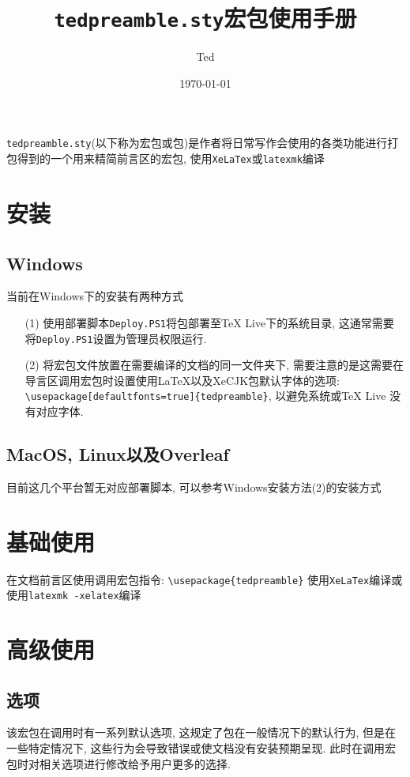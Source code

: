 \documentclass[12pt]{article}
\title{\texttt{tedpreamble.sty}宏包使用手册}
\author{Ted}
\date{\today}
\begin{document}
	\pagestyle{empty}
	\makeopening[email=true, ver=zh, time=zh]
	\begin{center}
		\parbox{0.6\textwidth}{\texttt{tedpreamble.sty}(以下称为宏包或包)是作者将日常写作会使用的各类功能进行打包得到的一个用来精简前言区的宏包, 使用\texttt{XeLaTex}或\texttt{latexmk}编译}
	\end{center}
	\newpage
	\tcbnonumber
	\newpage
	\pagestyle{fancy}
	\setcounter{page}{1}
	\section{安装}
	\subsection{Windows}
	当前在Windows下的安装有两种方式
	\begin{enumerate}
		\item[(1)] 使用部署脚本\texttt{Deploy.PS1}将包部署至TeX Live下的系统目录, 这通常需要将\texttt{Deploy.PS1}设置为管理员权限运行.
		\item[(2)] 将宏包文件放置在需要编译的文档的同一文件夹下, 需要注意的是这需要在导言区调用宏包时设置使用LaTeX以及XeCJK包默认字体的选项:  \lstinline|\usepackage[defaultfonts=true]{tedpreamble}|, 以避免系统或TeX Live 没有对应字体.
	\end{enumerate}
	
	\subsection{MacOS, Linux以及Overleaf}
	目前这几个平台暂无对应部署脚本, 可以参考Windows安装方法(2)的安装方式
	
	\section{基础使用}
	在文档前言区使用调用宏包指令: \lstinline|\usepackage{tedpreamble}| 使用\texttt{XeLaTex}编译或使用\texttt{latexmk -xelatex}编译
	
	\section{高级使用}
	\subsection{选项}
	该宏包在调用时有一系列默认选项, 这规定了包在一般情况下的默认行为, 但是在一些特定情况下, 这些行为会导致错误或使文档没有安装预期呈现. 此时在调用宏包时对相关选项进行修改给予用户更多的选择.
	
\end{document}
